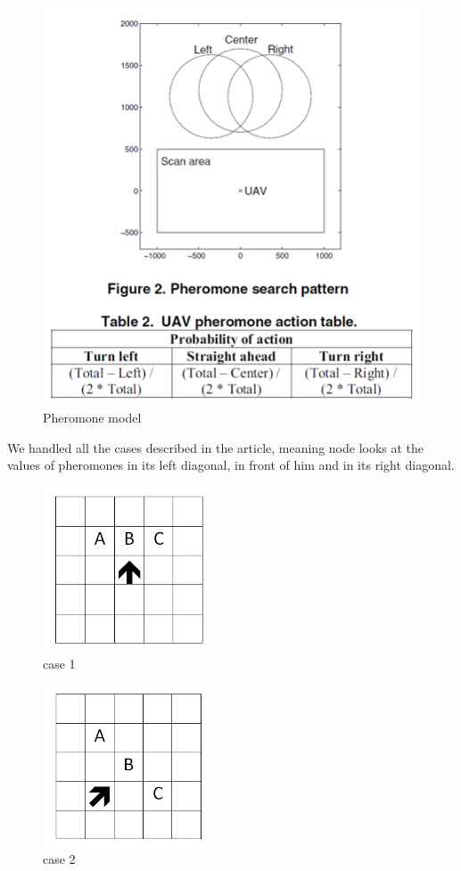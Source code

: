 \begin{figure}[!h]
\center
\includegraphics{../images/pheromon_model.png}
\caption{Pheromone model}
\end{figure}

\newpage

We handled all the cases described in the article, meaning node looks at the values of pheromones in its left diagonal, in front of him and in its right diagonal.

\begin{figure}[!h]
\center
\includegraphics[width=5cm]{../images/grille_case_1.png}
\caption{case 1}
\end{figure}

\newpage

\begin{figure}[!h]
\center
\includegraphics[width=5cm]{../images/grille_case_2.png}
\caption{case 2}
\end{figure}

